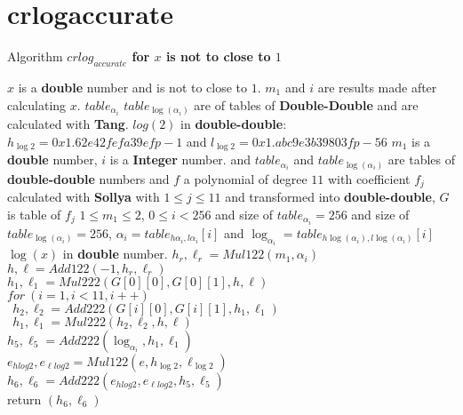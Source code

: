 \section*{crlogaccurate}
\begin{algorithm}[htbp]
  \caption{Algorithm \textbf{$crlog_{accurate}$ for $x$ is not to close to $1$ }}
\begin{algorithmic}[1]
\Condition $x$ is a \textbf{double} number and is not to close to $1$.
\Condition $m_1$ and $i$ are results made after calculating $x$.
\Condition $table_{\alpha_{i}}$  $table_{\log(\alpha_{i})}$ are of tables of \textbf{Double-Double} and are calculated with \textbf{Tang}.
\Condition $log(2)$ in \textbf{double-double}: $h_{\log2} = 0x1.62e42fefa39efp-1$ and $l_{\log2} = 0x1.abc9e3b39803fp-56$ 
\Input $m_1$ is a \textbf{double} number, $i$ is a \textbf{Integer} number.
and $table_{\alpha_{i}}$ and $table_{\log(\alpha_{i})}$ are  tables of \textbf{double-double} numbers and $f$ a polynomial of degree $11$ with coefficient $f_j$ calculated with \textbf{Sollya}
with $1\le j \le 11$ and transformed into \textbf{double-double}, $G$ is table of $f_j$
\Condition $1 \le m_1 \le 2 $, $0 \le i < 256$ and size of $table_{\alpha_{i}} = 256$
and size of $table_{\log (\alpha_{i})} = 256$, $\alpha_i = table_{h\alpha_{i},l\alpha_{i}}[i]$ and $\log_{\alpha_i} = table_{h\log (\alpha_{i}),l\log (\alpha_{i})}[i]$
\Output $\log(x)$ in \textbf{double} number.
\State $h_r,\ell_r = Mul122(m_1, \alpha_i )$\\
$h,\ell = Add122(-1,h_r,\ell_r)$\\
$h_1, \ell_1 = Mul222(G[0][0], G[0][1],h,\ell)$\\
$for \ (i = 1, i<11,i++)$\\
$\ \ h_2,\ell_2 = Add222(G[i][0], G[i][1],h_1, \ell_1)$\\
$\ \  h_1, \ell_1 = Mul222(h_2,\ell_2,h,\ell)$ \\
$h_5,\ell_5 = Add222(\log_{\alpha_i}, h_1, \ell_1)$\\
$e_{hlog2},e_{\ell log2} = Mul122(e, h_{\log2}, \ell_{\log2})$\\
$h_6, \ell_6 = Add222(e_{hlog2}, e_{\ell log2},h_5,\ell_5)$\\
return  $(h_6, \ell_6)$
\end{algorithmic}
\label{algo:crlogaccurate}
\end{algorithm}

